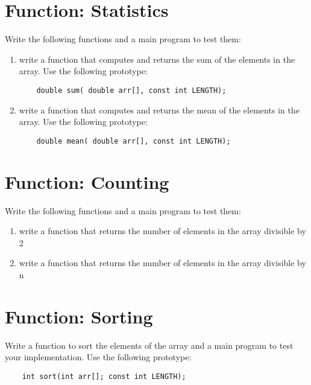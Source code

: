 \documentclass{article}
\begin{document}
\section*{Function: Statistics}
Write the following functions and a main program to test them:
\begin{enumerate}
	\item write a function that computes and returns the sum of the elements in the array. Use the following prototype:
	\begin{verbatim}
	double sum( double arr[], const int LENGTH);
	\end{verbatim}
	\item write a function that computes and returns the mean of the elements in the array. Use the following prototype:
	\begin{verbatim}
	double mean( double arr[], const int LENGTH);
	\end{verbatim}
\end{enumerate}

\section*{Function: Counting}
Write the following functions and a main program to test them:
\begin{enumerate}
	\item write a function that returns the number of elements in the array divisible by 2
	\item write a function that returns the number of elements in the array divisible by n
\end{enumerate}

\section*{Function: Sorting}
Write a function to sort the elements of the array and a main program to test your implementation. Use the following prototype:
\begin{verbatim}
	int sort(int arr[]; const int LENGTH);
\end{verbatim}
\end{document}
